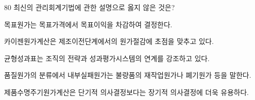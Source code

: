 \begin{question}{80}
최신의 관리회계기법에 관한 설명으로 옳지 않은 것은?
\begin{choices}
  \item 목표원가는 목표가격에서 목표이익을 차감하여 결정한다.
  \item 카이젠원가계산은 제조이전단계에서의 원가절감에 초점을 맞추고 있다.
  \item 균형성과표는 조직의 전략과 성과평가시스템의 연계를 강조하고 있다.
  \item 품질원가의 분류에서 내부실패원가는 불량품의 재작업원가나 폐기원가 등을 말한다.
  \item 제품수명주기원가계산은 단기적 의사결정보다는 장기적 의사결정에 더욱 유용하다.
\end{choices}
\end{question}
